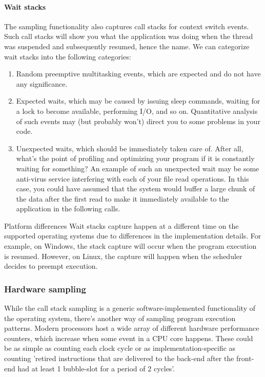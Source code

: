 \documentclass[hidelinks,titlepage,a4paper,twoside]{article}
\begin{document}
\paragraph{Wait stacks}
\label{waitstacks}

The sampling functionality also captures call stacks for context switch events. Such call stacks will show you what the application was doing when the thread was suspended and subsequently resumed, hence the name. We can categorize wait stacks into the following categories:

\begin{enumerate}
\item Random preemptive multitasking events, which are expected and do not have any significance.
\item Expected waits, which may be caused by issuing sleep commands, waiting for a lock to become available, performing I/O, and so on. Quantitative analysis of such events may (but probably won't) direct you to some problems in your code.
\item Unexpected waits, which should be immediately taken care of. After all, what's the point of profiling and optimizing your program if it is constantly waiting for something? An example of such an unexpected wait may be some anti-virus service interfering with each of your file read operations. In this case, you could have assumed that the system would buffer a large chunk of the data after the first read to make it immediately available to the application in the following calls.
\end{enumerate}

\begin{bclogo}[
noborder=true,
couleur=black!5,
logo=\bcattention
]{Platform differences}
Wait stacks capture happen at a different time on the supported operating systems due to differences in the implementation details. For example, on Windows, the stack capture will occur when the program execution is resumed. However, on Linux, the capture will happen when the scheduler decides to preempt execution.
\end{bclogo}

\subsubsection{Hardware sampling}
\label{hardwaresampling}

While the call stack sampling is a generic software-implemented functionality of the operating system, there's another way of sampling program execution patterns. Modern processors host a wide array of different hardware performance counters, which increase when some event in a CPU core happens. These could be as simple as counting each clock cycle or as implementation-specific as counting 'retired instructions that are delivered to the back-end after the front-end had at least 1 bubble-slot for a period of 2 cycles'.
\end{document}
